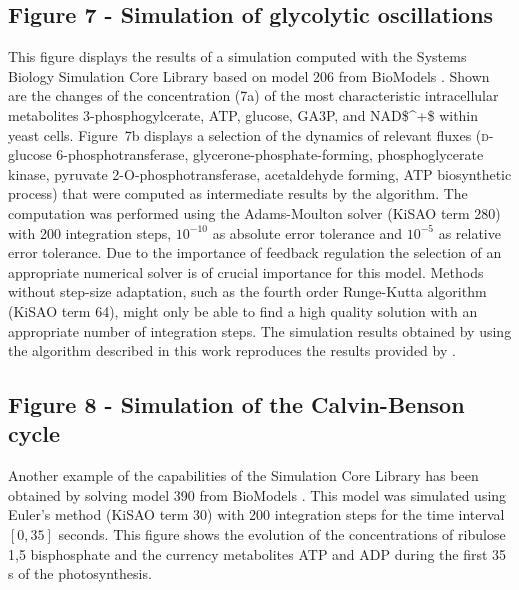 \documentclass[10pt]{bmc_article}
\newenvironment{bmcformat}{\fussy\setboolean{publ}{true}}{\fussy}
\begin{document}
\begin{bmcformat}
{\subsection*{Figure 7 - Simulation of glycolytic oscillations}
This figure displays the results of a simulation computed with the Systems
Biology Simulation Core Library based on model \COR{\numero} 206 from BioModels 
\cite{Novere2006a, Wolf2000}.
Shown are the changes of the concentration (7a) of the most characteristic
intracellular metabolites 3-phosphogylcerate, \acs{ATP}, glucose, \acf{GA3P},
and \acs{NAD$^+$} within yeast cells.
Figure~7b displays a selection of the dynamics of relevant fluxes 
(\textsc{d}-glucose 6-phosphotransferase, glycerone-phosphate-forming,
phosphoglycerate kinase, pyruvate 2-O-phosphotransferase, acetaldehyde forming,
\acs{ATP} biosynthetic process)
that were computed as intermediate results by the algorithm.
The computation was performed using the Adams-Moulton solver \cite{Hairer2000}
(\acs{KiSAO} term 280) with 200 integration steps, $10^{-10}$ as absolute error
tolerance and $10^{-5}$ as relative error tolerance.
Due to the importance of feedback regulation the selection of an appropriate
numerical solver is of crucial importance for this model.
Methods without step-size adaptation, such as the fourth order Runge-Kutta
algorithm (\acs{KiSAO} term 64), might only be able to find a high quality solution 
with an appropriate number of integration steps. 
The simulation results obtained by using the algorithm described in this work
reproduces the results provided by .

\subsection*{Figure 8 - Simulation of the Calvin-Benson cycle}
Another example of the capabilities of the Simulation Core Library has been
obtained by solving model \COR{\numero} 390 from BioModels  
\cite{Novere2006a, Arnold2011}.
This model was simulated using Euler's method (\acs{KiSAO} term 30) with 200
integration steps for the time interval $[0, 35]$ seconds.
This figure shows the evolution of the concentrations of ribulose 1,5
bisphosphate and the currency metabolites \acs{ATP} and \acs{ADP} during the first 35\,s of
the photosynthesis.


}
\end{bmcformat}
\end{document}
